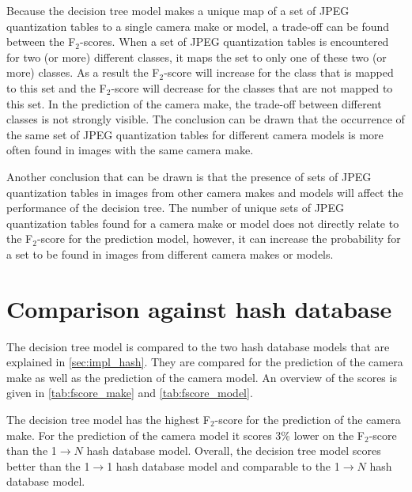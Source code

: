 Because the decision tree model makes a unique map of a set of JPEG quantization tables to a single camera make or model, a trade-off can be found between the F$_2$-scores. When a set of JPEG quantization tables is encountered for two (or more) different classes, it maps the set to only one of these two (or more) classes. As a result the F$_2$-score will increase for the class that is mapped to this set and the F$_2$-score will decrease for the classes that are not mapped to this set. In the prediction of the camera make, the trade-off between different classes is not strongly visible. The conclusion can be drawn that the occurrence of the same set of JPEG quantization tables for different camera models is more often found in images with the same camera make.

Another conclusion that can be drawn is that the presence of sets of JPEG quantization tables in images from other camera makes and models will affect the performance of the decision tree. The number of unique sets of JPEG quantization tables found for a camera make or model does not directly relate to the F$_2$-score for the prediction model, however, it can increase the probability for a set to be found in images from different camera makes or models.





\section{Comparison against hash database}
The decision tree model is compared to the two hash database models that are explained in \autoref{sec:impl_hash}. They are compared for the prediction of the camera make as well as the prediction of the camera model. An overview of the scores is given in \autoref{tab:fscore_make} and \autoref{tab:fscore_model}.

The decision tree model has the highest F$_2$-score for the prediction of the camera make. For the prediction of the camera model it scores 3\% lower on the F$_2$-score than the 1$\rightarrow N$ hash database model. Overall, the decision tree model scores better than the 1$\rightarrow$1 hash database model and comparable to the 1$\rightarrow N$ hash database model.

